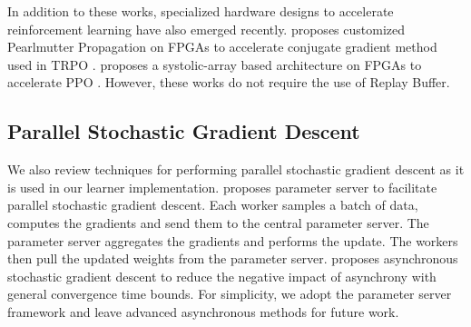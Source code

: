 In addition to these works, specialized hardware designs to accelerate reinforcement learning have also emerged recently. \cite{trpo_fpga} proposes customized Pearlmutter Propagation on FPGAs to accelerate conjugate gradient method used in TRPO \cite{trpo}. \cite{ppo_fpga} proposes a systolic-array based architecture on FPGAs to accelerate PPO \cite{ppo}. However, these works do not require the use of Replay Buffer.


\subsection{Parallel Stochastic Gradient Descent}
We also review techniques for performing parallel stochastic gradient descent as it is used in our learner implementation. \cite{parameter_server} proposes parameter server to facilitate parallel stochastic gradient descent. Each worker samples a batch of data, computes the gradients and send them to the central parameter server. The parameter server aggregates the gradients and performs the update. The workers then pull the updated weights from the parameter server. \cite{AsyncPSGD} proposes asynchronous stochastic gradient descent to reduce the negative impact of asynchrony with general convergence time bounds. For simplicity, we adopt the parameter server \cite{parameter_server} framework and leave advanced asynchronous methods for future work.